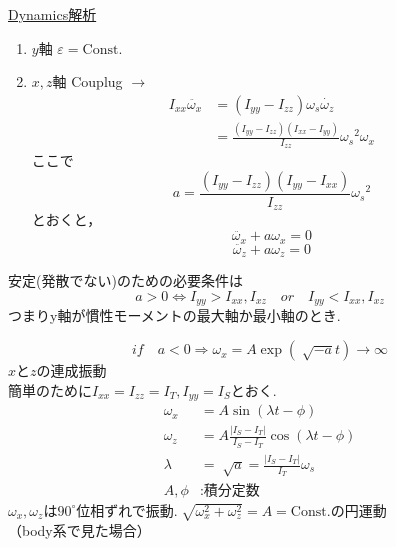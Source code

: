 \documentclass[class=article, crop=false, dvipdfmx]{standalone}
\begin{document}
\noindent
\underline{Dynamics解析}
\begin{enumerate}[label=\theenumi)]
\item $y$軸 \qquad $\varepsilon = \mathrm{Const.}$
\item $x, z$軸 \quad Couplug $\rightarrow$ 
	\begin{align}
    I_{xx} \ddot{\omega_x} 
    & = (I_{yy} - I_{zz})\omega_s \dot{\omega_z} \\
    &= \frac{(I_{yy}-I_{zz})(I_{xx}-I_{yy})}{I_{zz}}
    {\omega_s}^2 \omega_x
    \end{align}
    ここで
    \[ a = \frac{(I_{yy}-I_{zz})(I_{yy}-I_{xx})}{I_{zz}} {\omega_s}^2 \]
    とおくと，
    \[ \ddot{\omega_x} + a\omega_x = 0 \]
    \[ \ddot{\omega_z} + a\omega_z = 0 \]
\end{enumerate}
安定(発散でない)のための必要条件は
\begin{equation}
a>0\Leftrightarrow I_{yy}>I_{xx},I_{xz}\quad or \quad I_{yy}
< I_{xx}, I_{xz}
\end{equation}
つまりy軸が慣性モーメントの最大軸か最小軸のとき.

\begin{minipage}{0.45\linewidth}

\end{minipage}
\begin{minipage}{0.3\linewidth}

\end{minipage}


\begin{equation}
if\quad a<0 \Rightarrow
\omega_x=
A\exp(\sqrt[]{-a}t)\rightarrow\infty
\end{equation}
$x$と$z$の連成振動\\
簡単のために$I_{xx} = I_{zz}=I_T,I_{yy}=I_S$とおく.\\
\begin{align}
\omega_x&=A\sin(\lambda t-\phi)\\
\omega_z&=A\frac{|I_S-I_T|}{I_S-I_T}
\cos(\lambda t-\phi)\\
\lambda&=\sqrt[]{a}=\frac{|I_S-I_T|}{I_T}\omega_s\\
A,\phi&:\text{積分定数}
\end{align}
$\omega_x,\omega_z$は$90^\circ$位相ずれで振動.\qquad$\sqrt[]{\omega_x^2+\omega_z^2}=A=\mathrm{Const.}$の円運動\\


\noindent
（body系で見た場合）\\
\begin{center}
\begin{minipage}{0.45\linewidth}

\end{minipage}
\hspace{3zw}
\begin{minipage}{0.45\linewidth}

\end{minipage}
\end{center}
\vspace{\baselineskip}
\end{document}
